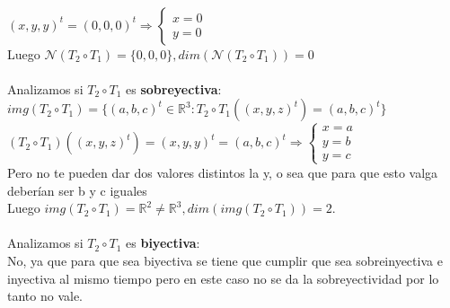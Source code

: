 \documentclass{article}
\begin{document}
\\
$(x,y,y)^t = (0,0,0)^t \Rightarrow \begin{cases} x=0 \\ y=0 \end{cases}$ \\
Luego $\mathcal{N}(T_2 \circ T_1) = \{0,0,0\}, dim(\mathcal{N}(T_2 \circ T_1)) = 0$
\\ \\
Analizamos si $T_2 \circ T_1$ es \textbf{sobreyectiva}: \\
$img(T_2 \circ T_1) = \{ (a,b,c)^t \in \mathbb{R}^3 : T_2 \circ T_1((x,y,z)^t) = (a,b,c)^t \}$ \\
$(T_2 \circ T_1)((x,y,z)^t) = (x,y,y)^t = (a,b,c)^t \Rightarrow \begin{cases} x=a \\ y=b \\ y=c \end{cases}$
\\ Pero no te pueden dar dos valores distintos la y, o sea que para que esto valga deberían ser b y c iguales
\\ Luego $img(T_2 \circ T_1) = \mathbb{R}^2 \not = \mathbb{R}^3, dim(img(T_2 \circ T_1)) = 2$.
\\ \\ Analizamos si $T_2 \circ T_1$ es \textbf{biyectiva}:
\\ No, ya que para que sea biyectiva se tiene que cumplir que sea sobreinyectiva e inyectiva al mismo
tiempo pero en este caso no se da la sobreyectividad por lo tanto no vale.
\\
\end{document}
